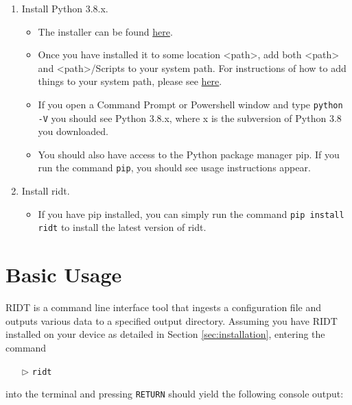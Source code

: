\documentclass[]{article}
\def\code#1{\texttt{#1}}
\begin{document}
\begin{enumerate}
    \item Install Python 3.8.x.
    \begin{itemize}
        \item The installer can be found
        \href{https://www.python.org/downloads/release/python-380/}{here}.
        \item Once you have installed it to some location <path>, add both
        <path> and <path>/Scripts to your system path. For instructions of how
        to add things to your system path, please see
        \href{https://docs.alfresco.com/4.2/tasks/fot-addpath.html}{here}.
        \item If you open a Command Prompt or Powershell window and type
        \code{python -V} you should see Python 3.8.x, where x is the subversion
        of Python 3.8 you downloaded.
        \item You should also have access to the Python package manager pip. If
        you run the command \code{pip}, you should see usage instructions appear. 
    \end{itemize}
    \item Install ridt.
    \begin{itemize}
        \item If you have pip installed, you can simply run the command
        \code{pip install ridt} to install the latest version of ridt.
    \end{itemize}
\end{enumerate}
  

\section{Basic Usage}

RIDT is a command line interface tool that ingests a configuration file and
outputs various data to a specified output directory. Assuming you have RIDT
installed on your device as detailed in Section \ref{sec:installation}, entering
the command 
\begin{itemize}
    \item[$\triangleright$] \code{ridt}
\end{itemize}
into the terminal and pressing \code{RETURN} should yield the following console
output:\\
\end{document}
